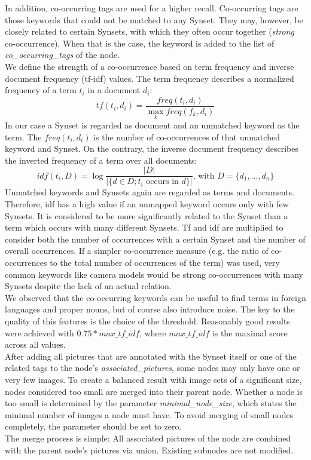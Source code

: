 In addition, co-occurring tags are used for a higher recall. Co-occurring tags are those keywords that could not be matched to any Synset. They may, however, be closely related to certain Synsets, with which they often occur together (\emph{strong} co-occurrence). When that is the case, the keyword is added to the list of \emph{co\_occurring\_tags} of the node. \\
We define the strength of a co-occurrence based on term frequency and inverse document frequency (tf-idf)  values. The term frequency describes a normalized frequency of a term $t_i$ in a document $d_i$:
\[tf(t_i,d_i) = \frac{freq(t_i,d_i)}{\max_k freq(f_k,d_i)}\]
In our case a Synset is regarded as document and an unmatched keyword as the term. The $freq(t_i,d_i)$ is the number of co-occurrences of that unmatched keyword and Synset. On the contrary, the inverse document frequency describes the inverted frequency of a term over all documents:
\[idf(t_i, D) = \log \frac{\vert D\vert}{\vert \{d \in D; t_i \text{ occurs in }d\}\vert} \text{, with } D = \{d_1,..., d_n\}\]
Unmatched keywords and Synsets again are regarded as terms and documents. Therefore, idf has a high value if an unmapped keyword occurs only with few Synsets. It is considered to be more significantly related to the Synset than a term which occurs with many different Synsets. Tf and idf are multiplied to consider both the number of occurrences with a certain Synset and the number of overall occurrences.
If a simpler co-occurrence measure (e.g. the ratio of co-occurrences to the total number of occurrences of the term) was used, very common keywords like camera models would be strong co-occurrences with many Synsets despite the lack of an actual relation. \\
We observed that the co-occurring keywords can be useful to find terms in foreign languages and proper nouns, but of course also introduce noise. The key to the quality of this features is the choice of the threshold. Reasonably good results were achieved with $0.75 * max\_tf\_idf$, where $max\_tf\_idf$ is the maximal score across all values. \\

After adding all pictures that are annotated with the Synset itself or one of the related tags to the node's \emph{associated\_pictures}, some nodes may only have one or very few images. To create a balanced result with image sets of a significant size, nodes considered too small are merged into their parent node. Whether a node is too small is determined by the parameter \emph{minimal\_node\_size}, which states the minimal number of images a node must have. To avoid merging of small nodes completely, the parameter should be set to zero.\\
The merge process is simple: All associated pictures of the node are combined with the parent node's pictures via union. Existing subnodes are not modified.

